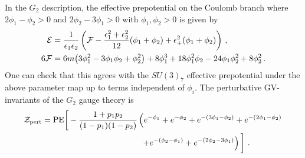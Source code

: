 In the $ G_2 $ description, the effective prepotential on the Coulomb branch where $2\phi_1-\phi_2>0$ and $2\phi_2-3\phi_1>0$ with $\phi_1,\phi_2>0$ is given by
\begin{align}
\mathcal{E} &= \frac{1}{\epsilon_1 \epsilon_2} 
\left( \mathcal{F} - \frac{\epsilon_1^2  + \epsilon_2^2}{12}(\phi_1 + \phi_2) +\epsilon_+^2 (\phi_1 + \phi_2) \right) \, , \nonumber \\ 
6\mathcal{F} &= 6 m \qty(3\phi_1^2 - 3\phi_1 \phi_2 + \phi_2^2 )+ 8\phi_1^3 + 18\phi_1^2 \phi_2 - 24\phi_1 \phi_2^2 + 8\phi_2^2  \, .
\end{align}
One can check that this agrees with the $ SU(3)_7 $ effective prepotential under the above parameter map up to terms independent of $\phi_i$. The perturbative GV-invariants of the $G_2$ gauge theory is
\begin{align}
	\mathcal{Z}_{\rm pert} &= {\rm PE} \bigg[ -\frac{1+p_1p_2}{(1-p_1)(1-p_2)}\left(e^{-\phi_1}+e^{-\phi_2} +e^{-(3\phi_1-\phi_2)}+e^{-(2\phi_1-\phi_2)}\right. \nonumber \\
	&\qquad \qquad \qquad \qquad \qquad \qquad \left.+e^{-(\phi_2-\phi_1)}+e^{-(2\phi_2-3\phi_1)}\right)\bigg] \ .
\end{align} 

